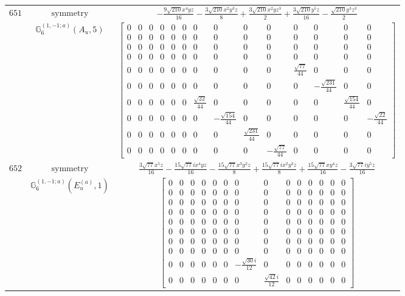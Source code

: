 \documentclass[fleqn,8pt,landscape]{jsarticle}
\begin{document}
\begin{longtable}{ccc}
$ 651 $ & $ \text{symmetry} $ & $ - \frac{9 \sqrt{210} x^{4} y z}{16} - \frac{3 \sqrt{210} x^{2} y^{3} z}{8} + \frac{3 \sqrt{210} x^{2} y z^{3}}{2} + \frac{3 \sqrt{210} y^{5} z}{16} - \frac{\sqrt{210} y^{3} z^{3}}{2} $ \\
$  $ & $ \mathbb{G}_{6}^{(1,-1;a)}(A_{u},5) $ & $ \begin{bmatrix} 0 & 0 & 0 & 0 & 0 & 0 & 0 & 0 & 0 & 0 & 0 & 0 & 0 & 0 \\ 0 & 0 & 0 & 0 & 0 & 0 & 0 & 0 & 0 & 0 & 0 & 0 & 0 & 0 \\ 0 & 0 & 0 & 0 & 0 & 0 & 0 & 0 & 0 & 0 & 0 & 0 & 0 & 0 \\ 0 & 0 & 0 & 0 & 0 & 0 & 0 & 0 & 0 & 0 & 0 & 0 & 0 & 0 \\ 0 & 0 & 0 & 0 & 0 & 0 & 0 & 0 & 0 & 0 & \frac{\sqrt{77}}{44} & 0 & 0 & 0 \\ 0 & 0 & 0 & 0 & 0 & 0 & 0 & 0 & 0 & 0 & 0 & - \frac{\sqrt{231}}{44} & 0 & 0 \\ 0 & 0 & 0 & 0 & 0 & 0 & \frac{\sqrt{22}}{44} & 0 & 0 & 0 & 0 & 0 & \frac{\sqrt{154}}{44} & 0 \\ 0 & 0 & 0 & 0 & 0 & 0 & 0 & - \frac{\sqrt{154}}{44} & 0 & 0 & 0 & 0 & 0 & - \frac{\sqrt{22}}{44} \\ 0 & 0 & 0 & 0 & 0 & 0 & 0 & 0 & \frac{\sqrt{231}}{44} & 0 & 0 & 0 & 0 & 0 \\ 0 & 0 & 0 & 0 & 0 & 0 & 0 & 0 & 0 & - \frac{\sqrt{77}}{44} & 0 & 0 & 0 & 0 \end{bmatrix} $ \\ \hline
$ 652 $ & $ \text{symmetry} $ & $ \frac{3 \sqrt{77} x^{5} z}{16} - \frac{15 \sqrt{77} i x^{4} y z}{16} - \frac{15 \sqrt{77} x^{3} y^{2} z}{8} + \frac{15 \sqrt{77} i x^{2} y^{3} z}{8} + \frac{15 \sqrt{77} x y^{4} z}{16} - \frac{3 \sqrt{77} i y^{5} z}{16} $ \\
$  $ & $ \mathbb{G}_{6}^{(1,-1;a)}(E_{u}^{(a)},1) $ & $ \begin{bmatrix} 0 & 0 & 0 & 0 & 0 & 0 & 0 & 0 & 0 & 0 & 0 & 0 & 0 & 0 \\ 0 & 0 & 0 & 0 & 0 & 0 & 0 & 0 & 0 & 0 & 0 & 0 & 0 & 0 \\ 0 & 0 & 0 & 0 & 0 & 0 & 0 & 0 & 0 & 0 & 0 & 0 & 0 & 0 \\ 0 & 0 & 0 & 0 & 0 & 0 & 0 & 0 & 0 & 0 & 0 & 0 & 0 & 0 \\ 0 & 0 & 0 & 0 & 0 & 0 & 0 & 0 & 0 & 0 & 0 & 0 & 0 & 0 \\ 0 & 0 & 0 & 0 & 0 & 0 & 0 & 0 & 0 & 0 & 0 & 0 & 0 & 0 \\ 0 & 0 & 0 & 0 & 0 & 0 & 0 & 0 & 0 & 0 & 0 & 0 & 0 & 0 \\ 0 & 0 & 0 & 0 & 0 & 0 & 0 & 0 & 0 & 0 & 0 & 0 & 0 & 0 \\ 0 & 0 & 0 & 0 & 0 & 0 & - \frac{\sqrt{30} i}{12} & 0 & 0 & 0 & 0 & 0 & 0 & 0 \\ 0 & 0 & 0 & 0 & 0 & 0 & 0 & \frac{\sqrt{42} i}{12} & 0 & 0 & 0 & 0 & 0 & 0 \end{bmatrix} $ \\ \hline

\end{longtable}
\end{document}
